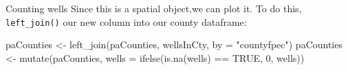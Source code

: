 \documentclass[
  ignorenonframetext,
]{beamer}
\newenvironment{Shaded}{\begin{snugshade}}{\end{snugshade}}
\newcommand{\AttributeTok}[1]{\textcolor[rgb]{0.77,0.63,0.00}{#1}}
\newcommand{\ConstantTok}[1]{\textcolor[rgb]{0.00,0.00,0.00}{#1}}
\newcommand{\DecValTok}[1]{\textcolor[rgb]{0.00,0.00,0.81}{#1}}
\newcommand{\FunctionTok}[1]{\textcolor[rgb]{0.00,0.00,0.00}{#1}}
\newcommand{\NormalTok}[1]{#1}
\newcommand{\OtherTok}[1]{\textcolor[rgb]{0.56,0.35,0.01}{#1}}
\newcommand{\SpecialCharTok}[1]{\textcolor[rgb]{0.00,0.00,0.00}{#1}}
\newcommand{\StringTok}[1]{\textcolor[rgb]{0.31,0.60,0.02}{#1}}
\begin{document}
\begin{frame}[fragile]{Counting wells}
\protect\hypertarget{counting-wells-1}{}
Since this is a spatial object,we can plot it. To do this,
\texttt{left\_join()} our new column into our county dataframe:

\tiny

\begin{Shaded}
\begin{Highlighting}[]
\NormalTok{paCounties }\OtherTok{\textless{}{-}} \FunctionTok{left\_join}\NormalTok{(paCounties, wellsInCty, }\AttributeTok{by =} \StringTok{"countyfpec"}\NormalTok{)}
\NormalTok{paCounties }\OtherTok{\textless{}{-}} \FunctionTok{mutate}\NormalTok{(paCounties, }\AttributeTok{wells =} \FunctionTok{ifelse}\NormalTok{(}\FunctionTok{is.na}\NormalTok{(wells) }\SpecialCharTok{==} \ConstantTok{TRUE}\NormalTok{, }\DecValTok{0}\NormalTok{, wells))}


\end{Highlighting}
\end{Shaded}
\end{frame}
\end{document}
